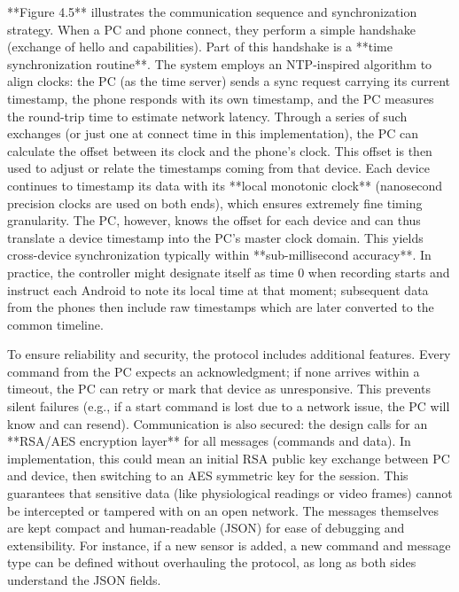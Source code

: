 \documentclass[12pt,a4paper]{article}
\begin{document}
{**Figure 4.5** illustrates the communication sequence and
synchronization strategy. When a PC and phone connect, they perform a
simple handshake (exchange of hello and capabilities). Part of this
handshake is a **time synchronization routine**. The system employs an
NTP-inspired algorithm to align clocks: the PC (as the time server)
sends a sync request carrying its current timestamp, the phone responds
with its own timestamp, and the PC measures the round-trip time to
estimate network latency. Through a series of such exchanges (or just
one at connect time in this implementation), the PC can calculate the
offset between its clock and the phone's clock. This offset is then used
to adjust or relate the timestamps coming from that device. Each device
continues to timestamp its data with its **local monotonic clock**
(nanosecond precision clocks are used on both ends), which ensures
extremely fine timing granularity. The PC, however, knows the offset for
each device and can thus translate a device timestamp into the PC's
master clock domain. This yields cross-device synchronization typically
within **sub-millisecond accuracy**. In practice, the controller might
designate itself as time 0 when recording starts and instruct each
Android to note its local time at that moment; subsequent data from the
phones then include raw timestamps which are later converted to the
common timeline.

To ensure reliability and security, the protocol includes additional
features. Every command from the PC expects an acknowledgment; if none
arrives within a timeout, the PC can retry or mark that device as
unresponsive. This prevents silent failures (e.g., if a start command is
lost due to a network issue, the PC will know and can resend).
Communication is also secured: the design calls for an **RSA/AES
encryption layer** for all messages (commands and data). In
implementation, this could mean an initial RSA public key exchange
between PC and device, then switching to an AES symmetric key for the
session. This guarantees that sensitive data (like physiological
readings or video frames) cannot be intercepted or tampered with on an
open network. The messages themselves are kept compact and
human-readable (JSON) for ease of debugging and extensibility. For
instance, if a new sensor is added, a new command and message type can
be defined without overhauling the protocol, as long as both sides
understand the JSON fields.

}
\end{document}
